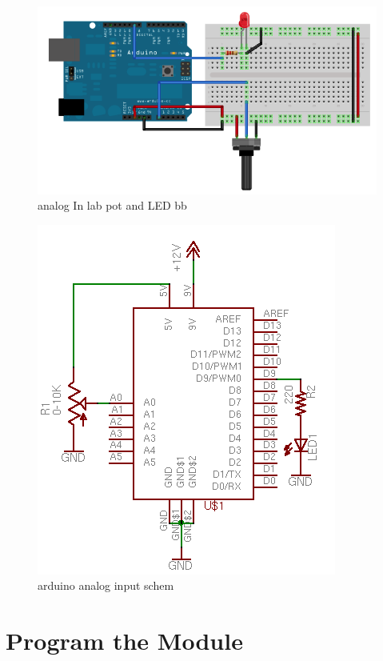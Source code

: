 \begin{figure}[!htb]
 \centering
 \includegraphics[scale=0.3]{img/analogio/analog_In_lab_pot_and_LED_bb.png}
 \caption{analog In lab pot and LED bb}
 \label{analog In lab pot and LED bb}
\end{figure}


\begin{figure}[!htb]
 \centering
 \includegraphics[scale=0.6]{img/analogio/arduino_analog_input_schem.png}
 \caption{arduino analog input schem}
 \label{arduino analog input schem}
\end{figure}

\section{Program the Module}

